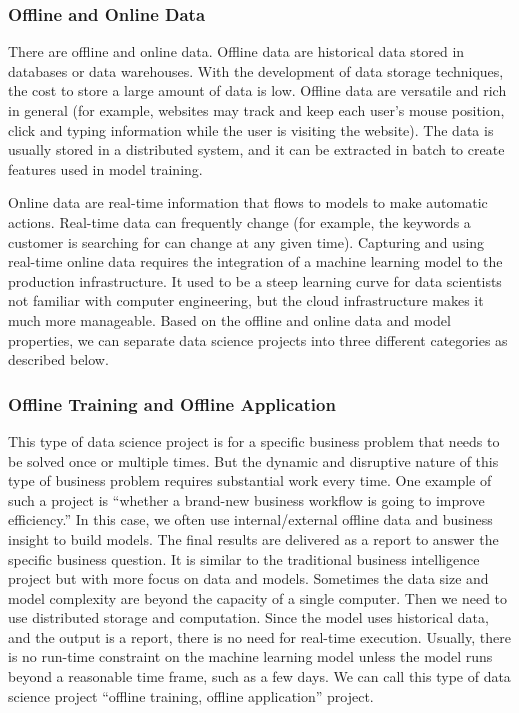 \documentclass[
  12pt,
]{krantz}
\begin{document}
\hypertarget{offline-and-online-data}{%
\subsubsection{Offline and Online Data}\label{offline-and-online-data}}

There are offline and online data. Offline data are historical data stored in databases or data warehouses. With the development of data storage techniques, the cost to store a large amount of data is low. Offline data are versatile and rich in general (for example, websites may track and keep each user's mouse position, click and typing information while the user is visiting the website). The data is usually stored in a distributed system, and it can be extracted in batch to create features used in model training.

Online data are real-time information that flows to models to make automatic actions. Real-time data can frequently change (for example, the keywords a customer is searching for can change at any given time). Capturing and using real-time online data requires the integration of a machine learning model to the production infrastructure. It used to be a steep learning curve for data scientists not familiar with computer engineering, but the cloud infrastructure makes it much more manageable. Based on the offline and online data and model properties, we can separate data science projects into three different categories as described below.

\hypertarget{offline-training-and-offline-application}{%
\subsubsection{Offline Training and Offline Application}\label{offline-training-and-offline-application}}

This type of data science project is for a specific business problem that needs to be solved once or multiple times. But the dynamic and disruptive nature of this type of business problem requires substantial work every time. One example of such a project is ``whether a brand-new business workflow is going to improve efficiency.'' In this case, we often use internal/external offline data and business insight to build models. The final results are delivered as a report to answer the specific business question. It is similar to the traditional business intelligence project but with more focus on data and models. Sometimes the data size and model complexity are beyond the capacity of a single computer. Then we need to use distributed storage and computation. Since the model uses historical data, and the output is a report, there is no need for real-time execution. Usually, there is no run-time constraint on the machine learning model unless the model runs beyond a reasonable time frame, such as a few days. We can call this type of data science project ``offline training, offline application'' project.
\end{document}

